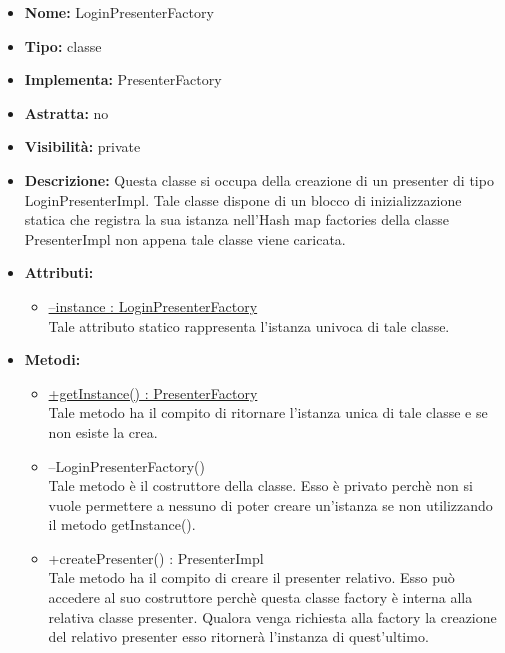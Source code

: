 			
			\begin{itemize}
			\item \textbf{Nome:} LoginPresenterFactory
			\item \textbf{Tipo:} classe
			
		\item \textbf{Implementa:}
		PresenterFactory
		\item \textbf{Astratta:}
		no
			\item \textbf{Visibilità:} private
			\item \textbf{Descrizione:} Questa classe si occupa della creazione di un presenter di tipo LoginPresenterImpl.  Tale classe dispone di un blocco di inizializzazione statica che registra la sua istanza nell'Hash map factories della classe PresenterImpl non appena tale classe viene caricata.
			\item \textbf{Attributi:}
				\begin{itemize}
				\setlength{\itemsep}{5pt}
				
					\item[\ding{111}] \underline{--instance : LoginPresenterFactory} \\ [1mm] Tale attributo statico rappresenta l'istanza univoca di tale classe.
				\end{itemize}
		
			\item \textbf{Metodi:}
				\begin{itemize}
				\setlength{\itemsep}{5pt}
				
					\item[\ding{111}] {\underline{+getInstance() : PresenterFactory}} \\ [1mm] Tale metodo ha il compito di ritornare l'istanza unica di tale classe e se non esiste la crea.
					\item[\ding{111}] {{--LoginPresenterFactory()}} \\ [1mm] Tale metodo è il costruttore della classe. Esso è privato perchè non si vuole permettere a nessuno di poter creare un'istanza se non utilizzando il metodo getInstance().
					\item[\ding{111}] {{+createPresenter() : PresenterImpl}} \\ [1mm] Tale metodo ha il compito di creare il presenter relativo. Esso può accedere al suo costruttore perchè questa classe factory è interna alla relativa classe presenter. Qualora venga richiesta alla factory la creazione del relativo presenter esso ritornerà l'instanza di quest'ultimo.
				\end{itemize}
		
			\end{itemize}


